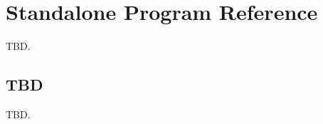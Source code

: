 \chapter{Standalone Program Reference}
\label{cspr2}

TBD.


\section{TBD}
\label{cspr2:stdd0}

TBD.



